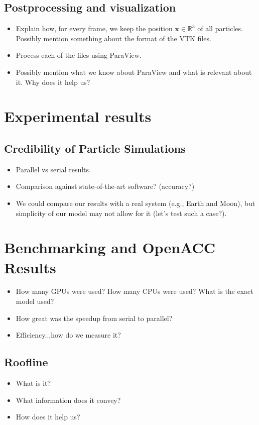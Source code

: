 \documentclass{usiinftr}
\begin{document}

\subsection{Postprocessing and visualization}
%
\begin{itemize}
	\item Explain how, for every frame, we keep the position $\mathbf{x} \in \mathbb{R}^3$ of all particles. Possibly mention something about the format of the VTK files.
	\item Process each of the files using ParaView.
	\item Possibly mention what we know about ParaView and what is relevant about it. Why does it help us?
\end{itemize}
%

\section{Experimental results}


\subsection{Credibility of Particle Simulations}
%
\begin{itemize}
	\item Parallel vs serial results.
	\item Comparison against state-of-the-art software? (accuracy?)
	\item We could compare our results with a real system (e.g., Earth and Moon), but simplicity of our model may not allow for it (let's test such a case?).
\end{itemize}
%

\section{Benchmarking and OpenACC Results} 
\label{sec:benchmarking}
%
\begin{itemize}
	\item How many GPUs were used? How many CPUs were used? What is the exact model used? 
	\item How great was the speedup from serial to parallel?
	\item Efficiency...how do we measure it?
\end{itemize}
%

\subsection{Roofline}
%
\begin{itemize}
	\item What is it?
	\item What information does it convey?
	\item How does it help us?
\end{itemize}
%
\end{document}

